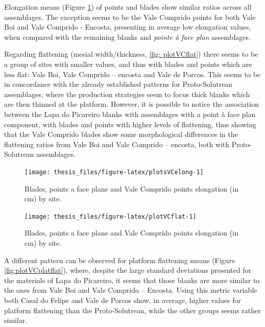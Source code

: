 \documentclass[12pt,twoside]{reedthesis}
\begin{document}
Elongation means (Figure \ref{fig:plotsVCelong}) of points and blades show similar ratios across all assemblages. The exception seems to be the Vale Comprido points for both Vale Boi and Vale Comprido - Encosta, presenting in average low elongation values, when compared with the remaining blanks and \emph{pointe à face plan} assemblages.

Regarding flattening (mesial width/thickness, \ref{fig: plotVCflat}) there seems to be a group of sites with smaller values, and thus with blades and points which are less flat: Vale Boi, Vale Comprido -- encosta and Vale de Porcos. This seems to be in concordance with the already established patterns for Proto-Solutrean assemblages, where the production strategies seem to focus thick blanks which are then thinned at the platform. However, it is possible to notice the association between the Lapa do Picareiro blanks with assemblages with a point à face plan component, with blades and points with higher levels of flattening, thus showing that the Vale Comprido blades show some morphological differences in the flattening ratios from Vale Boi and Vale Comprido -- encosta, both with Proto-Solutrean assemblages.
\begin{figure}[H]

{\centering \texttt{[image: thesis\_files/figure-latex/plotsVCelong-1]} 

}

\caption{Blades, points a face plane and Vale Comprido points elongation (in cm) by site.}\label{fig:plotsVCelong}
\end{figure}
\begin{figure}[H]

{\centering \texttt{[image: thesis\_files/figure-latex/plotVCflat-1]} 

}

\caption{Blades, points a face plane and Vale Comprido points elongation (in cm) by site.}\label{fig:plotVCflat}
\end{figure}
A different pattern can be observed for platform flattening means (Figure \ref{fig:plotVCplatflat}), where, despite the large standard deviations presented for the materials of Lapa do Picareiro, it seems that those blanks are more similar to the ones from Vale Boi and Vale Comprido -- Encosta. Using this metric variable both Casal do Felipe and Vale de Porcos show, in average, higher values for platform flattening than the Proto-Solutrean, while the other groups seems rather similar.
\end{document}
